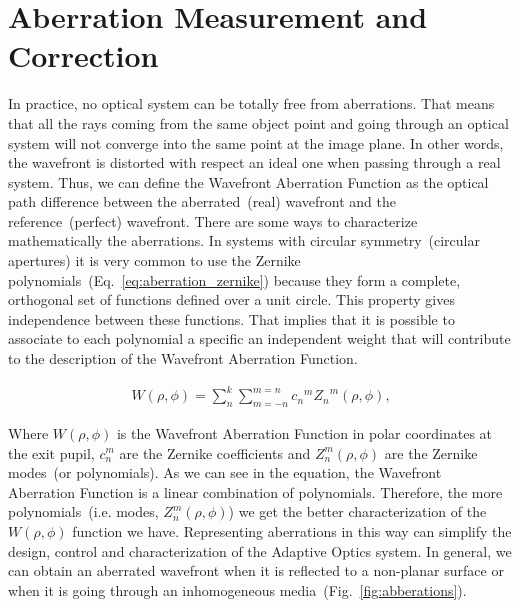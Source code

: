 \section{Aberration Measurement and Correction}
\label{Measurement}

In practice, no optical system can be totally free from aberrations. That means that all the rays coming from the same object point and going through an optical system will not converge into the same point at the image plane. In other words, the wavefront is distorted with respect an ideal one when passing through a real system. Thus, we can define the Wavefront Aberration Function as the optical path difference between the aberrated~(real) wavefront and the reference~(perfect) wavefront.      
There are some ways to characterize mathematically the aberrations. In systems with circular symmetry~(circular apertures) it is very common to use the Zernike polynomials~(Eq.~\eqref{eq:aberration_zernike}) because they form a complete, orthogonal set of functions defined over a unit circle. This property gives independence between these functions. That implies that it is possible to associate to each polynomial a specific an independent weight that will contribute to the description of the Wavefront Aberration Function.  

\begin{align}
	\ W(\rho,\phi) = {\sum_{n}^{k}}{\sum_{m=-n}^{m=n}}{{c_n}^m {Z_n}^m}{(\rho,\phi)},
	\label{eq:aberration_zernike}
\end{align}

Where $W(\rho,\phi)$ is the Wavefront Aberration Function in polar coordinates at the exit pupil, $c_n^m$ are the Zernike coefficients and $Z_n^m (\rho,\phi)$ are the Zernike modes~(or polynomials). As we can see in the equation, the Wavefront Aberration Function is a linear combination of polynomials. Therefore, the more polynomials~(i.e. modes, $Z_n^m (\rho,\phi)$) we get the better characterization of the $W(\rho,\phi)$ function we have.
Representing aberrations in this way can simplify the design, control and characterization of the Adaptive Optics system. 
In general, we can obtain an aberrated wavefront when it is reflected to a non-planar surface or when it is going through an inhomogeneous media~(Fig.~\ref{fig:abberations}). 

